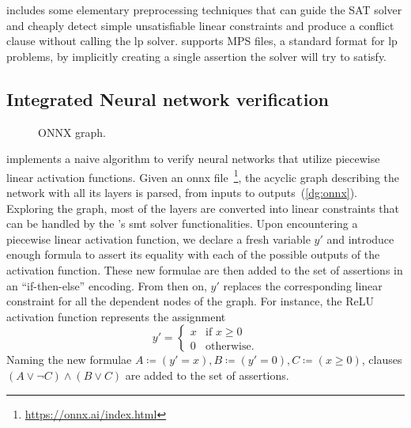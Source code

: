 \documentclass[runningheads]{llncs}
\begin{document}
\dlinear includes some elementary preprocessing techniques that can guide the SAT solver and cheaply detect simple unsatisfiable linear constraints and produce a conflict clause without calling the \gls{lp} solver.
\dlinear supports MPS files, a standard format for \gls{lp} problems, by implicitly creating a single assertion the solver will try to satisfy.

\subsection{Integrated Neural network verification}
\label{sec:nn-verification}

\begin{figure}
    \captionsetup{font=small}
    \vspace{-1cm}
    \resizebox{1.04\linewidth}{!}{%
        
    }
    \caption{ONNX graph.}
    \label{dg:onnx}
\end{figure}

\dlinear implements a naive algorithm to verify neural networks that utilize piecewise linear activation functions.
Given an \gls{onnx} file~\footnote{\url{https://onnx.ai/index.html}}, the acyclic graph describing the network with all its layers is parsed, from inputs to outputs~(\autoref{dg:onnx}).
Exploring the graph, most of the layers are converted into linear constraints that can be handled by the \dlinear's \gls{smt} solver functionalities.
Upon encountering a piecewise linear activation function, we declare a fresh variable $y'$ and introduce enough formula to assert its equality with each of the possible outputs of the activation function.
These new formulae are then added to the set of assertions in an ``if-then-else'' encoding.
From then on, $y'$ replaces the corresponding linear constraint for all the dependent nodes of the graph.
For instance, the ReLU activation function represents the assignment
\begin{equation*}
    y' = \begin{cases}
        x & \text{if } x \ge 0 \\
        0 & \text{otherwise} .
    \end{cases}
\end{equation*}
Naming the new formulae $A \coloneqq (y' = x), B \coloneqq (y' = 0), C \coloneqq (x \ge 0)$, clauses $(A \lor \neg C) \land (B \lor C)$ are added to the set of assertions.
\end{document}
